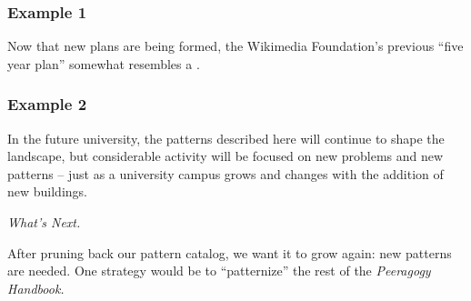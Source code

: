 \subsubsection*{Example 1} Now that new plans are being formed, the Wikimedia Foundation's previous ``five year plan'' somewhat
resembles a  \cite{wikimedia2011plan}.

\subsubsection*{Example 2} 
In the future university, the patterns described here will continue to
shape the landscape, but considerable activity will be focused on new
problems and new patterns -- just as a university campus grows and
changes with the addition of new buildings.

\begin{framed}
\noindent 
\emph{What's Next.}
\begin{collectinmacro}{\ScrapbookWN}{}{}
After pruning back our pattern catalog, we want it to grow again: new patterns are needed.
One strategy would be to ``patternize'' the rest of the \emph{Peeragogy Handbook.}
\end{collectinmacro}
\ScrapbookWN
\end{framed}


